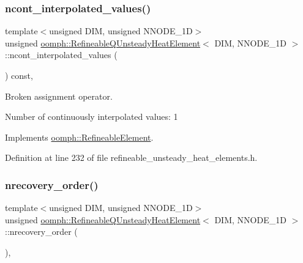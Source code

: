 \mbox{\label{classoomph_1_1RefineableQUnsteadyHeatElement_a243ef941f45a040393b542992babdfcf}} 
\subsubsection{\texorpdfstring{ncont\+\_\+interpolated\+\_\+values()}{ncont\_interpolated\_values()}}
{\footnotesize\ttfamily template$<$unsigned D\+IM, unsigned N\+N\+O\+D\+E\+\_\+1D$>$ \\
unsigned \hyperlink{classoomph_1_1RefineableQUnsteadyHeatElement}{oomph\+::\+Refineable\+Q\+Unsteady\+Heat\+Element}$<$ D\+IM, N\+N\+O\+D\+E\+\_\+1D $>$\+::ncont\+\_\+interpolated\+\_\+values (\begin{DoxyParamCaption}{ }\end{DoxyParamCaption}) const\hspace{0.3cm}{\ttfamily [inline]}, {\ttfamily [virtual]}}



Broken assignment operator. 

Number of continuously interpolated values\+: 1 

Implements \hyperlink{classoomph_1_1RefineableElement_a53e171a18c9f43f1db90a6876516a073}{oomph\+::\+Refineable\+Element}.



Definition at line 232 of file refineable\+\_\+unsteady\+\_\+heat\+\_\+elements.\+h.

\mbox{\label{classoomph_1_1RefineableQUnsteadyHeatElement_ae216355ba4c445c8d9b46fe4c799c482}} 
\subsubsection{\texorpdfstring{nrecovery\+\_\+order()}{nrecovery\_order()}}
{\footnotesize\ttfamily template$<$unsigned D\+IM, unsigned N\+N\+O\+D\+E\+\_\+1D$>$ \\
unsigned \hyperlink{classoomph_1_1RefineableQUnsteadyHeatElement}{oomph\+::\+Refineable\+Q\+Unsteady\+Heat\+Element}$<$ D\+IM, N\+N\+O\+D\+E\+\_\+1D $>$\+::nrecovery\+\_\+order (\begin{DoxyParamCaption}{ }\end{DoxyParamCaption})\hspace{0.3cm}{\ttfamily [inline]}, {\ttfamily [virtual]}}



